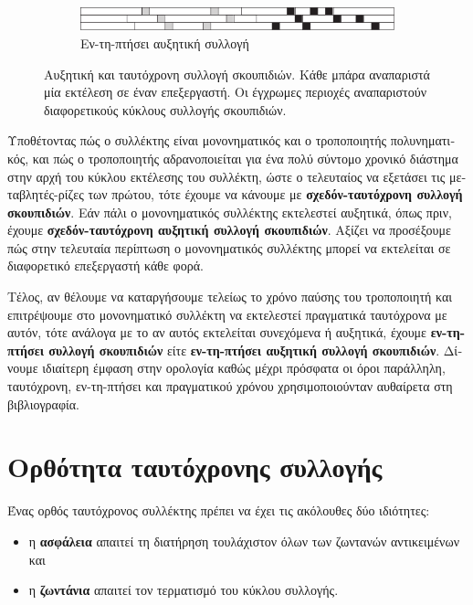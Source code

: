 \begin{greek}
\begin{figure}
  \begin{subfigure}[b]{1.0\textwidth}
    \includegraphics{figures/conc_1g}
    \caption{Εν-τη-πτήσει αυξητική συλλογή}
  \end{subfigure}
    
   \caption[Αυξητική και ταυτόχρονη συλλογή σκουπιδιών]
     {Αυξητική και ταυτόχρονη συλλογή σκουπιδιών. Κάθε μπάρα αναπαριστά μία εκτέλεση σε έναν επεξεργαστή.
      Οι έγχρωμες περιοχές αναπαριστούν διαφορετικούς κύκλους
      συλλογής σκουπιδιών.}
\end{figure}

Υποθέτοντας πώς ο συλλέκτης είναι μονονηματικός και ο
τροποποιητής πολυνηματικός, και πώς ο τροποποιητής
αδρανοποιείται για ένα πολύ σύντομο χρονικό διάστημα στην
αρχή του κύκλου εκτέλεσης του συλλέκτη, ώστε ο τελευταίος να
εξετάσει τις μεταβλητές-ρίζες των πρώτου, τότε έχουμε να
κάνουμε με \textbf{σχεδόν-ταυτόχρονη συλλογή σκουπιδιών}. Εάν
πάλι ο μονονηματικός συλλέκτης εκτελεστεί αυξητικά, όπως πριν,
έχουμε \textbf{σχεδόν-ταυτόχρονη αυξητική συλλογή σκουπιδιών}.
Αξίζει να προσέξουμε πώς στην τελευταία περίπτωση ο
μονονηματικός συλλέκτης μπορεί να εκτελείται σε διαφορετικό 
επεξεργαστή κάθε φορά.

Τέλος, αν θέλουμε να καταργήσουμε τελείως το χρόνο παύσης του
τροποποιητή και επιτρέψουμε στο μονονηματικό συλλέκτη να
εκτελεστεί πραγματικά ταυτόχρονα με αυτόν, τότε ανάλογα με το
αν αυτός εκτελείται συνεχόμενα ή αυξητικά, έχουμε
\textbf{εν-τη-πτήσει συλλογή σκουπιδιών} είτε
\textbf{εν-τη-πτήσει αυξητική συλλογή σκουπιδιών}. Δίνουμε
ιδιαίτερη έμφαση στην ορολογία καθώς μέχρι πρόσφατα οι όροι
παράλληλη, ταυτόχρονη, εν-τη-πτήσει και πραγματικού χρόνου
χρησιμοποιούνταν αυθαίρετα στη βιβλιογραφία.

\section{Ορθότητα ταυτόχρονης συλλογής}
Ένας ορθός ταυτόχρονος συλλέκτης πρέπει να έχει τις ακόλουθες
δύο ιδιότητες:

\begin{itemize}
\item η \textbf{ασφάλεια} απαιτεί τη διατήρηση τουλάχιστον
      όλων των ζωντανών αντικειμένων και
\item η \textbf{ζωντάνια} απαιτεί τον τερματισμό του κύκλου
      συλλογής.
\end{itemize}


\end{greek}
